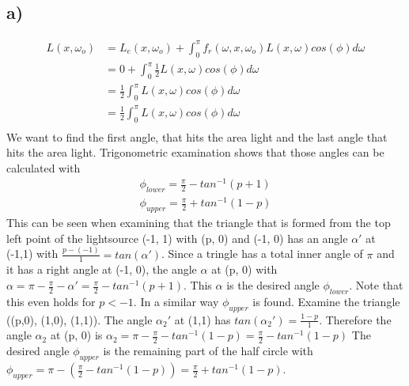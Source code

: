 \documentclass[a4paper]{scrartcl}
\begin{document}
  \subsection*{a)}
    \begin{align*}
      L(x,\omega_o)
      &=L_e(x,\omega_o) + \int_{0}^\pi f_r(\omega, x, \omega_o) L(x,\omega)cos(\phi)d\omega\\
      &=0 + \int_{0}^\pi \frac{1}{2} L(x,\omega)cos(\phi)d\omega\\
      &=\frac{1}{2}\int_{0}^\pi L(x,\omega)cos(\phi)d\omega\\
      &=\frac{1}{2}\int_{0}^\pi L(x,\omega)cos(\phi)d\omega\\
    \end{align*}
    We want to find  the first angle, that hits the area light and the last angle that hits the area light. Trigonometric examination shows that those angles can be calculated with 
    \begin{align*}
      \phi_{lower} = \frac{\pi}{2} - tan^{-1}(p + 1) \\
      \phi_{upper} = \frac{\pi}{2} + tan^{-1}(1-p)
    \end{align*}
    This can be seen when examining that the triangle that is formed from the top left point of the lightsource (-1, 1) with (p, 0) and (-1, 0) has an angle $\alpha'$ at (-1,1) with $\frac{p - (-1)}{1} = tan(\alpha')$. 
    Since a tringle has a total inner angle of $\pi$ and it has a right angle at (-1, 0), the angle $\alpha$ at (p, 0) with $\alpha = \pi - \frac{\pi}{2} - \alpha' = \frac{\pi}{2} - tan^{-1}(p+1)$. This $\alpha$ is the desired angle 
    $\phi_{lower}$. Note that this even holds for $p < -1$. In a similar way $\phi_{upper}$ is found. 
    Examine the triangle ((p,0), (1,0), (1,1)). The angle $\alpha_2'$ at (1,1) has $tan(\alpha_2') = \frac{1-p}{1}$. Therefore the angle $\alpha_2$  at (p, 0) is $\alpha_2 = \pi - \frac{\pi}{2} - tan^{-1}(1-p) = \frac{\pi}{2} - tan^{-1}(1-p)$
    The desired angle $\phi_{upper}$ is the remaining part of the half circle with $\phi_{upper} = \pi - (\frac{\pi}{2} - tan^{-1}(1-p)) = \frac{\pi}{2} + tan^{-1}(1-p)$.
\end{document}
